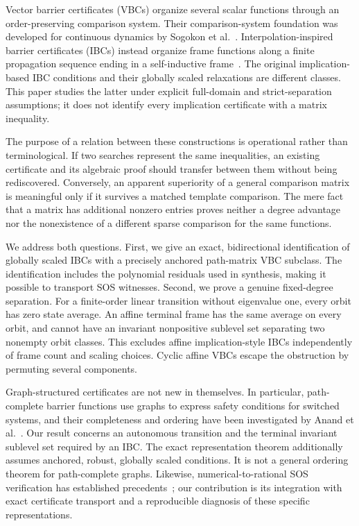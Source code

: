 \documentclass[5p,times]{elsarticle}
\theoremstyle{definition}\newtheorem{definition}[theorem]{Definition}
\theoremstyle{remark}\newtheorem{remark}[theorem]{Remark}
\begin{document}
Vector barrier certificates (VBCs) organize several scalar functions through an order-preserving comparison system. Their comparison-system foundation was developed for continuous dynamics by Sogokon et al.~\cite{sogokon}. Interpolation-inspired barrier certificates (IBCs) instead organize frame functions along a finite propagation sequence ending in a self-inductive frame~\cite{oumer}. The original implication-based IBC conditions and their globally scaled relaxations are different classes. This paper studies the latter under explicit full-domain and strict-separation assumptions; it does not identify every implication certificate with a matrix inequality.

The purpose of a relation between these constructions is operational rather than terminological. If two searches represent the same inequalities, an existing certificate and its algebraic proof should transfer between them without being rediscovered. Conversely, an apparent superiority of a general comparison matrix is meaningful only if it survives a matched template comparison. The mere fact that a matrix has additional nonzero entries proves neither a degree advantage nor the nonexistence of a different sparse comparison for the same functions.

We address both questions. First, we give an exact, bidirectional identification of globally scaled IBCs with a precisely anchored path-matrix VBC subclass. The identification includes the polynomial residuals used in synthesis, making it possible to transport SOS witnesses. Second, we prove a genuine fixed-degree separation. For a finite-order linear transition without eigenvalue one, every orbit has zero state average. An affine terminal frame has the same average on every orbit, and cannot have an invariant nonpositive sublevel set separating two nonempty orbit classes. This excludes affine implication-style IBCs independently of frame count and scaling choices. Cyclic affine VBCs escape the obstruction by permuting several components.

Graph-structured certificates are not new in themselves. In particular, path-complete barrier functions use graphs to express safety conditions for switched systems, and their completeness and ordering have been investigated by Anand et al.~\cite{anand}. Our result concerns an autonomous transition and the terminal invariant sublevel set required by an IBC. The exact representation theorem additionally assumes anchored, robust, globally scaled conditions. It is not a general ordering theorem for path-complete graphs. Likewise, numerical-to-rational SOS verification has established precedents~\cite{peyrl}; our contribution is its integration with exact certificate transport and a reproducible diagnosis of these specific representations.
\end{document}

